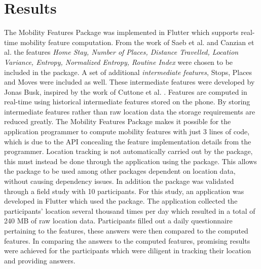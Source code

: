\section{Results}
The Mobility Features Package was implemented in Flutter which supports real-time mobility feature computation. From the work of Saeb et al. \cite{Saeb2015} and Canzian et al. \cite{Canzian2015} the features \textit{Home Stay, Number of Places, Distance Travelled, Location Variance, Entropy, Normalized Entropy, Routine Index} were chosen to be included in the package. A set of additional \textit{intermediate features}, Stops, Places and Moves were included as well. These intermediate features were developed by Jonas Busk, inspired by the work of Cuttone et al. \cite{sparse-location-2014}. Features are computed in real-time using historical intermediate features stored on the phone. By storing intermediate features rather than raw location data the storage requirements are reduced greatly. The Mobility Features Package makes it possible for the application programmer to compute mobility features with just 3 lines of code, which is due to the API concealing the feature implementation details from the programmer. Location tracking is not automatically carried out by the package, this must instead be done through the application using the package. This allows the package to be used among other packages dependent on location data, without causing dependency issues. In addition the package was validated through a field study with 10 participants. For this study, an application was developed in Flutter which used the package. The application collected the participants' location several thousand times per day which resulted in a total of 240 MB of raw location data. Participants filled out a daily questionnaire pertaining to the features, these answers were then compared to the computed features. In comparing the answers to the computed features, promising results were achieved for the participants which were diligent in tracking their location and providing answers. 